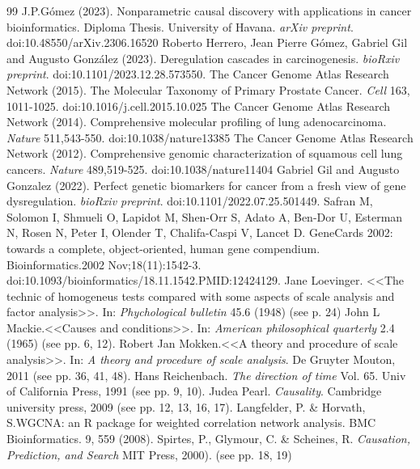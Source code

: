 \documentclass[12pt,a4paper]{report}
\begin{document}
\begin{thebibliography}{99}
J.P.Gómez (2023). Nonparametric causal discovery with applications in cancer bioinformatics. Diploma Thesis. University of Havana. \textit{arXiv preprint}. doi:10.48550/arXiv.2306.16520
Roberto Herrero, Jean Pierre Gómez, Gabriel Gil and Augusto González (2023). Deregulation cascades in carcinogenesis. \textit{bioRxiv preprint}. doi:10.1101/2023.12.28.573550.
The Cancer Genome Atlas Research Network (2015). The Molecular Taxonomy of Primary Prostate Cancer. \textit{Cell} 163, 1011-1025. doi:10.1016/j.cell.2015.10.025
The Cancer Genome Atlas Research Network (2014). Comprehensive molecular profiling of lung adenocarcinoma. \textit{Nature} 511,543-550. doi:10.1038/nature13385
The Cancer Genome Atlas Research Network (2012). Comprehensive genomic characterization of squamous cell lung cancers. \textit{Nature} 489,519-525. doi:10.1038/nature11404
 Gabriel Gil and Augusto Gonzalez (2022). Perfect genetic biomarkers for cancer from a fresh view of gene dysregulation. \textit{bioRxiv preprint}. doi:10.1101/2022.07.25.501449.
Safran M, Solomon I, Shmueli O, Lapidot M, Shen-Orr S, Adato A, Ben-Dor U, Esterman N, Rosen N, Peter I, Olender T, Chalifa-Caspi V, Lancet D. GeneCards 2002: towards a complete, object-oriented, human gene compendium. Bioinformatics.2002 Nov;18(11):1542-3. doi:10.1093/bioinformatics/18.11.1542.PMID:12424129.
Jane Loevinger. <<The technic of homogeneus tests compared with some aspects of scale analysis and factor analysis>>. In: \textit{Phychological bulletin} 45.6 (1948) (see p. 24)
John L Mackie.<<Causes and conditions>>. In: \textit{American philosophical quarterly} 2.4 (1965) (see pp. 6, 12).
Robert Jan Mokken.<<A theory and procedure of scale analysis>>. In: \textit{A theory and procedure of scale analysis}. De Gruyter Mouton, 2011 (see pp. 36, 41, 48).
 Hans Reichenbach. \textit{The direction of time} Vol. 65. Univ of California Press, 1991 (see pp. 9, 10).
Judea Pearl. \textit{Causality}. Cambridge university press, 2009 (see pp. 12, 13, 16, 17). 
Langfelder, P. \&  Horvath, S.WGCNA: an R package for weighted correlation network analysis. BMC Bioinformatics. 9, 559 (2008).
Spirtes, P., Glymour, C. \& Scheines, R. \textit{Causation, Prediction, and Search} MIT Press, 2000). (see pp. 18, 19)

\end{thebibliography}
\end{document}
